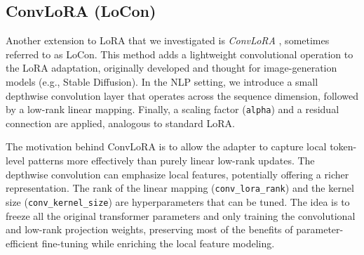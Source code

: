 \subsection{ConvLoRA (LoCon)}
Another extension to LoRA that we investigated is \textit{ConvLoRA} \cite{zhong2024convolutionmeetsloraparameter}, sometimes referred to as LoCon. This method adds a lightweight convolutional operation to the LoRA adaptation, originally developed and thought for image-generation models (e.g., Stable Diffusion). In the NLP setting, we introduce a small depthwise convolution layer that operates across the sequence dimension, followed by a low-rank linear mapping. Finally, a scaling factor (\texttt{alpha}) and a residual connection are applied, analogous to standard LoRA.

The motivation behind ConvLoRA is to allow the adapter to capture local token-level patterns more effectively than purely linear low-rank updates. The depthwise convolution can emphasize local features, potentially offering a richer representation. The rank of the linear mapping (\texttt{conv\_lora\_rank}) and the kernel size (\texttt{conv\_kernel\_size}) are hyperparameters that can be tuned. The idea is to freeze all the original transformer parameters and only training the convolutional and low-rank projection weights, preserving most of the benefits of parameter-efficient fine-tuning while enriching the local feature modeling.

